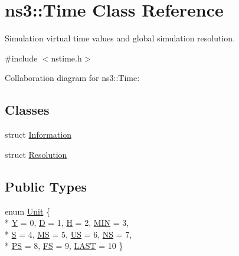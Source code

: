 \hypertarget{classns3_1_1Time}{}\section{ns3\+:\+:Time Class Reference}
\label{classns3_1_1Time}


Simulation virtual time values and global simulation resolution.  




{\ttfamily \#include $<$nstime.\+h$>$}



Collaboration diagram for ns3\+:\+:Time\+:
\subsection*{Classes}
\begin{DoxyCompactItemize}
\item 
struct \hyperlink{structns3_1_1Time_1_1Information}{Information}
\item 
struct \hyperlink{structns3_1_1Time_1_1Resolution}{Resolution}
\end{DoxyCompactItemize}
\subsection*{Public Types}
\begin{DoxyCompactItemize}
\item 
enum \hyperlink{classns3_1_1Time_a87a7f4d29c68b047a72d291ad660295a}{Unit} \{ \\*
\hyperlink{classns3_1_1Time_a87a7f4d29c68b047a72d291ad660295aa93b748b67f19962213e21351471b9894}{Y} = 0, 
\hyperlink{classns3_1_1Time_a87a7f4d29c68b047a72d291ad660295aa57d629936515b651f647fc7b9dbdd337}{D} = 1, 
\hyperlink{classns3_1_1Time_a87a7f4d29c68b047a72d291ad660295aab086c75db915fe77224398f4def87de6}{H} = 2, 
\hyperlink{classns3_1_1Time_a87a7f4d29c68b047a72d291ad660295aabdaf8c3839253c104b01320f8a66475d}{M\+IN} = 3, 
\\*
\hyperlink{classns3_1_1Time_a87a7f4d29c68b047a72d291ad660295aade8622b06524a328cd3a59db6ccf76af}{S} = 4, 
\hyperlink{classns3_1_1Time_a87a7f4d29c68b047a72d291ad660295aad6c18469b17e6491073c861555c40de4}{MS} = 5, 
\hyperlink{classns3_1_1Time_a87a7f4d29c68b047a72d291ad660295aa58d3fcfd769acff64cf67f227d55fdd0}{US} = 6, 
\hyperlink{classns3_1_1Time_a87a7f4d29c68b047a72d291ad660295aae324232af1b8cf625cecd92a22e0f2dc}{NS} = 7, 
\\*
\hyperlink{classns3_1_1Time_a87a7f4d29c68b047a72d291ad660295aa5e93b59c5cb64d785f14e393a92ce95d}{PS} = 8, 
\hyperlink{classns3_1_1Time_a87a7f4d29c68b047a72d291ad660295aaa9a5b8ae2d139fd44f3d89bd48e342b1}{FS} = 9, 
\hyperlink{classns3_1_1Time_a87a7f4d29c68b047a72d291ad660295aa755473043e6387ca81410ed6d433439f}{L\+A\+ST} = 10
 \}
\end{DoxyCompactItemize}
